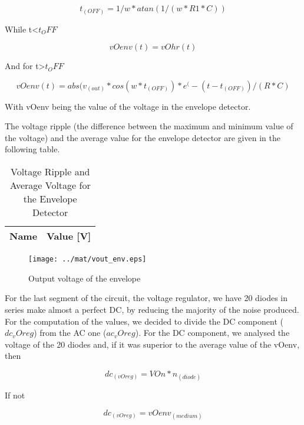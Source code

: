 \begin{equation}
t_(OFF) = 1/w * atan(1/(w*R1*C))
\label{eq:1.1}
\end{equation}

While t<$t_OFF$

\begin{equation}
vOenv (t) = vOhr (t)
\label{eq:1.2}
\end{equation}

And for t>$t_OFF$

\begin{equation}
vOenv (t) = abs(v_(out)*cos(w*t_(OFF))*e^(-(t-t_(OFF))/(R*C)
\label{eq:1.3}
\end{equation}

With vOenv being the value of the voltage in the envelope detector.

The voltage ripple (the difference between the maximum and minimum value of the voltage) and the average value for the envelope detector are given in the following table.

\begin{table}[H]
  \centering
  \begin{tabular}{|l|r|}
    \hline    
    {\bf Name} & {\bf Value [V]} \\ \hline
    
  \end{tabular}
  \caption{Voltage Ripple and Average Voltage for the Envelope Detector}
  \label{tab:mat3}
\end{table}

\begin{figure}[H] \centering
\texttt{[image: ../mat/vout\_env.eps]}
\caption{Output voltage of the envelope}
\label{fig:mat4}
\end{figure}

For the last segment of the circuit, the voltage regulator, we have 20 diodes in series make almost a perfect DC, by reducing the majority of the noise produced. For the computation of the values, we decided to divide the DC component ($dc_vOreg$) from the AC one ($ac_vOreg$).
For the DC component, we analysed the voltage of the 20 diodes and, if it was superior to the average value of the vOenv, then

\begin{equation}
dc_(vOreg) = VOn*n_(diode)
\label{eq:1.4}
\end{equation}

If not

\begin{equation}
dc_(vOreg) = vOenv_(medium)
\label{eq:1.5}
\end{equation}

